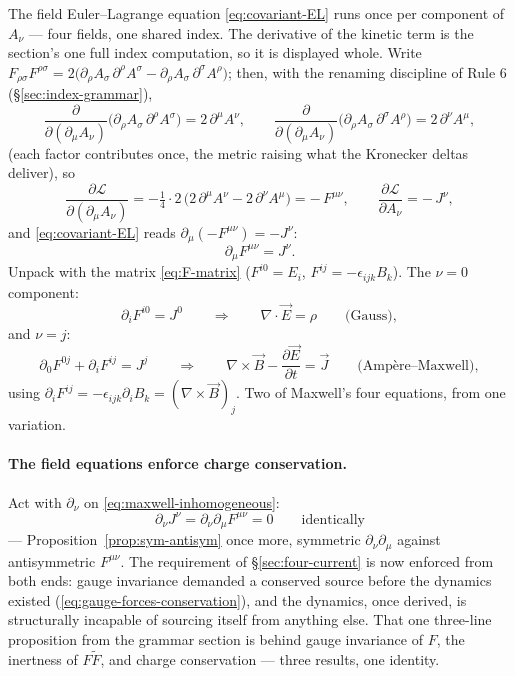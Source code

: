 \documentclass[11pt]{article}
\theoremstyle{plain}
\theoremstyle{definition}
\theoremstyle{remark}
\newcommand{\pd}[2]{\frac{\partial #1}{\partial #2}}
\newcommand{\vE}{\vec{E}}
\newcommand{\vB}{\vec{B}}
\begin{document}
The field Euler--Lagrange equation \eqref{eq:covariant-EL} runs once
per component of $A_\nu$ --- four fields, one shared index. The
derivative of the kinetic term is the section's one full index
computation, so it is displayed whole. Write
$F_{\rho\sigma}F^{\rho\sigma}
= 2\bigl(\partial_\rho A_\sigma\,\partial^\rho A^\sigma
- \partial_\rho A_\sigma\,\partial^\sigma A^\rho\bigr)$; then, with
the renaming discipline of Rule 6 (\S\ref{sec:index-grammar}),
\begin{equation}
  \pd{}{(\partial_\mu A_\nu)}
  \bigl(\partial_\rho A_\sigma\,\partial^\rho A^\sigma\bigr)
  = 2\,\partial^\mu A^\nu,
  \qquad
  \pd{}{(\partial_\mu A_\nu)}
  \bigl(\partial_\rho A_\sigma\,\partial^\sigma A^\rho\bigr)
  = 2\,\partial^\nu A^\mu,
\end{equation}
(each factor contributes once, the metric raising what the Kronecker
deltas deliver), so
\begin{equation}
  \pd{\mathcal L}{(\partial_\mu A_\nu)}
  = -\tfrac14 \cdot 2\,
    \bigl(2\,\partial^\mu A^\nu - 2\,\partial^\nu A^\mu\bigr)
  = -\,F^{\mu\nu},
  \qquad
  \pd{\mathcal L}{A_\nu} = -\,J^\nu ,
\end{equation}
and \eqref{eq:covariant-EL} reads
$\partial_\mu(-F^{\mu\nu}) = -J^\nu$:
\begin{equation}
  \boxed{\;
  \partial_\mu F^{\mu\nu} = J^\nu .
  \;}
  \label{eq:maxwell-inhomogeneous}
\end{equation}
Unpack with the matrix \eqref{eq:F-matrix} ($F^{i0} = E_i$,
$F^{ij} = -\epsilon_{ijk}B_k$). The $\nu = 0$ component:
\begin{equation}
  \partial_i F^{i0} = J^0
  \qquad\Longrightarrow\qquad
  \nabla\cdot\vE = \rho
  \qquad\text{(Gauss)},
\end{equation}
and $\nu = j$:
\begin{equation}
  \partial_0 F^{0j} + \partial_i F^{ij} = J^j
  \qquad\Longrightarrow\qquad
  \nabla\times\vB - \pd{\vE}{t} = \vec J
  \qquad\text{(Amp\`ere--Maxwell)},
\end{equation}
using $\partial_i F^{ij} = -\epsilon_{ijk}\partial_i B_k
= (\nabla\times\vB)_j$. Two of Maxwell's four equations, from one
variation.

\paragraph{The field equations enforce charge conservation.} Act with $\partial_\nu$
on \eqref{eq:maxwell-inhomogeneous}:
\begin{equation}
  \partial_\nu J^\nu
  = \partial_\nu \partial_\mu F^{\mu\nu}
  = 0
  \qquad\text{identically}
\end{equation}
--- Proposition~\ref{prop:sym-antisym} once more, symmetric
$\partial_\nu\partial_\mu$ against antisymmetric $F^{\mu\nu}$. The
requirement of \S\ref{sec:four-current} is now enforced from both ends:
gauge invariance demanded a conserved source before the dynamics
existed (\ref{eq:gauge-forces-conservation}), and the dynamics, once
derived, is structurally incapable of sourcing itself from anything
else. That one three-line proposition from the grammar section
is behind gauge invariance of $F$, the inertness of $F\tilde F$,
and charge conservation --- three results, one identity.
\end{document}
